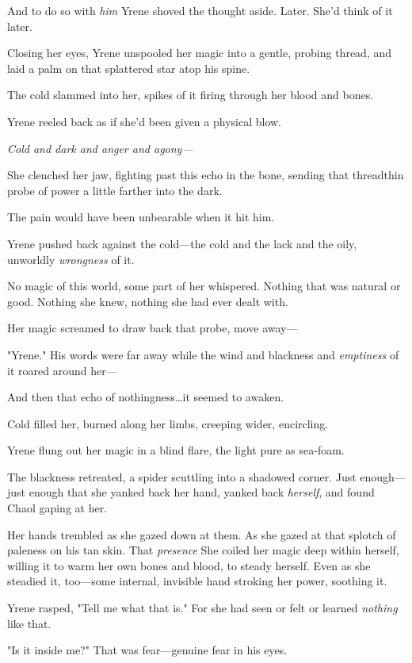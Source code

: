 And to do so with \emph{him}  Yrene shoved the thought aside.
Later.
She'd think of it later.

Closing her eyes, Yrene unspooled her magic into a gentle, probing thread, and laid a palm on that splattered star atop his spine.

The cold slammed into her, spikes of it firing through her blood and bones.

Yrene reeled back as if she'd been given a physical blow.

\emph{Cold and dark and anger and agony---}

She clenched her jaw, fighting past this echo in the bone, sending that threadthin probe of power a little farther into the dark.

The pain would have been unbearable when it hit him.

Yrene pushed back against the cold---the cold and the lack and the oily, unworldly \emph{wrongness} of it.

No magic of this world, some part of her whispered.
Nothing that was natural or good.
Nothing she knew, nothing she had ever dealt with.

Her magic screamed to draw back that probe, move away---

"Yrene."
His words were far away while the wind and blackness and \emph{emptiness} of it roared around her---

And then that echo of nothingness\ldots it seemed to awaken.

Cold filled her, burned along her limbs, creeping wider, encircling.

Yrene flung out her magic in a blind flare, the light pure as sea-foam.

The blackness retreated, a spider scuttling into a shadowed corner.
Just enough---just enough that she yanked back her hand, yanked back \emph{herself}, and found Chaol gaping at her.

Her hands trembled as she gazed down at them.
As she gazed at that splotch of paleness on his tan skin.
That \emph{presence}  She coiled her magic deep within herself, willing it to warm her own bones and blood, to steady herself.
Even as she steadied it, too---some internal, invisible hand stroking her power, soothing it.

Yrene rasped, "Tell me what that is."
For she had seen or felt or learned \emph{nothing} like that.

"Is it inside me?"
That was fear---genuine fear in his eyes.

